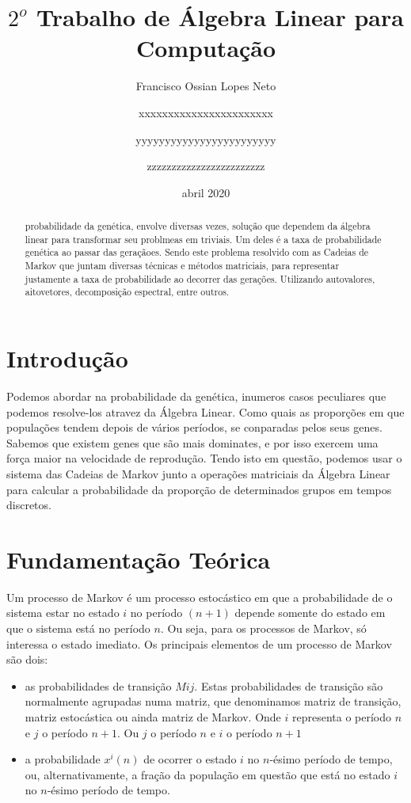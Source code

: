 \documentclass[14pt]{article}
\title{$2^o$ Trabalho de Álgebra Linear para Computação}
\author{
  Francisco Ossian Lopes Neto\\
  \and
  xxxxxxxxxxxxxxxxxxxxxxx\\
  \and
  yyyyyyyyyyyyyyyyyyyyyyyy\\
  \and
  zzzzzzzzzzzzzzzzzzzzzzzz\\
  \and
}
\date{abril 2020}
\begin{document}
\maketitle

\begin{abstract}
probabilidade da genética, envolve diversas vezes, solução que dependem da álgebra linear para transformar seu problmeas em triviais. Um deles é a taxa de probabilidade genética ao passar das geraçãoes. Sendo este problema resolvido com as Cadeias de Markov que juntam diversas técnicas e métodos matriciais, para representar justamente a taxa de probabilidade ao decorrer das gerações. Utilizando autovalores, aitovetores, decomposição espectral, entre outros.
\end{abstract}


\section{Introdução}
\label{sec:introducao}

Podemos abordar na probabilidade da genética, inumeros casos peculiares que podemos resolve-los atravez da Álgebra Linear. Como quais as proporções em que populações tendem depois de vários períodos, se conparadas pelos seus genes. Sabemos que existem genes que são mais dominates, e por isso exercem uma força maior na velocidade de reprodução. Tendo isto em questão, podemos usar o sistema das Cadeias de Markov junto a operações matriciais da Álgebra Linear para calcular a probabilidade da proporção de determinados grupos em tempos discretos. 


\section{Fundamentação Teórica}
\label{sec:fundamentacao}

Um processo de Markov é um processo estocástico em que a probabilidade de o sistema estar no estado $i$ no período $(n+1)$ depende somente do estado em que o sistema está no período $n$. Ou seja, para os processos de Markov, só interessa o estado imediato. Os principais elementos de um processo de Markov são dois:

\begin{itemize}

\item as probabilidades de transição $Mij$. Estas probabilidades de transição são normalmente agrupadas numa matriz, que denominamos matriz de transição, matriz estocástica ou ainda matriz de Markov. Onde $i$ representa o período $n$ e $j$ o período $n+1$. Ou $j$ o período $n$ e $i$ o período $n+1$

\item a probabilidade $x^i(n)$ de ocorrer o estado $i$ no $n$-ésimo período de tempo, ou, alternativamente, a fração da população em questão que está no estado $i$ no $n$-ésimo período de tempo.

\end{itemize}
\end{document}
